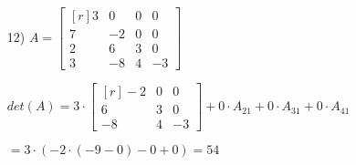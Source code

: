 \documentclass{article}
\begin{document}
\begin{enumerate}
    \item[12)]
      $A = 
      \begin{bmatrix*}[r]
        3&0&0&0\\
        7&-2&0&0\\
        2&6&3&0\\
        3&-8&4&-3
      \end{bmatrix*}$

      $det(A) = 3\cdot
      \begin{bmatrix*}[r]
        -2&0&0\\
        6&3&0\\
        -8&4&-3
      \end{bmatrix*}
      +0\cdot A_{21}+0\cdot A_{31}+0\cdot A_{41}$

      $=3\cdot(-2\cdot(-9-0)-0+0) = 54$ 

  \end{enumerate}
\end{document}
